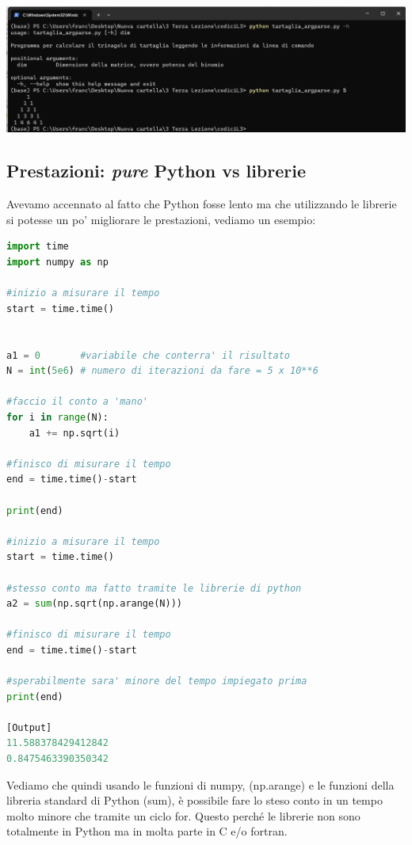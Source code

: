 \documentclass[10pt,a4paper]{article}
\begin{document}
\begin{center}
\includegraphics[scale=0.4]{img/shell_argparse.png}
\end{center}

\subsection{Prestazioni: \textit{pure} Python vs librerie}
Avevamo accennato al fatto che Python fosse lento ma che utilizzando le librerie si potesse un po' migliorare le prestazioni, vediamo un esempio:

\begin{lstlisting}[language=Python]
import time
import numpy as np

#inizio a misurare il tempo
start = time.time()


a1 = 0       #variabile che conterra' il risultato
N = int(5e6) # numero di iterazioni da fare = 5 x 10**6

#faccio il conto a 'mano'
for i in range(N):
    a1 += np.sqrt(i)

#finisco di misurare il tempo
end = time.time()-start

print(end)

#inizio a misurare il tempo
start = time.time()

#stesso conto ma fatto tramite le librerie di python
a2 = sum(np.sqrt(np.arange(N)))

#finisco di misurare il tempo
end = time.time()-start

#sperabilmente sara' minore del tempo impiegato prima
print(end)

[Output]
11.588378429412842
0.8475463390350342
\end{lstlisting}
Vediamo che quindi usando le funzioni di numpy, (np.arange) e le funzioni della libreria standard di Python (sum), è possibile fare lo steso conto in un tempo molto minore che tramite un ciclo for. Questo perché le librerie non sono totalmente in Python ma in molta parte in C e/o fortran.
\end{document}
